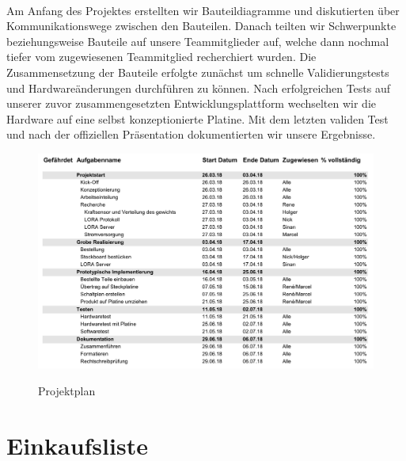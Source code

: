 \\
Am Anfang des Projektes erstellten wir Bauteildiagramme und diskutierten über Kommunikationswege zwischen den Bauteilen. Danach teilten wir Schwerpunkte beziehungsweise Bauteile auf unsere Teammitglieder auf, welche dann nochmal tiefer vom zugewiesenen Teammitglied recherchiert wurden. Die Zusammensetzung der Bauteile erfolgte zunächst um schnelle Validierungstests und Hardwareänderungen durchführen zu können. Nach erfolgreichen Tests auf unserer zuvor zusammengesetzten Entwicklungsplattform wechselten wir die Hardware auf eine selbst konzeptionierte Platine. Mit dem letzten validen Test und nach der offiziellen Präsentation dokumentierten wir unsere Ergebnisse.

\begin{figure}[ht]
    \center
    \includegraphics[width=15cm]{Bilder/projektplan.png}\\
    \caption{Projektplan}
    \label{fig:Projektplan}
\end{figure}
\chapter{Einkaufsliste}

